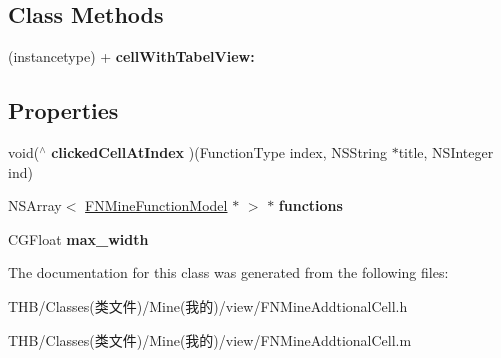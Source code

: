 \subsection*{Class Methods}
\begin{DoxyCompactItemize}
\item 
\mbox{\label{interface_f_n_mine_addtional_cell_ae7cf18af97248812af0f597f8e801eae}} 
(instancetype) + {\bfseries cell\+With\+Tabel\+View\+:}
\end{DoxyCompactItemize}
\subsection*{Properties}
\begin{DoxyCompactItemize}
\item 
\mbox{\label{interface_f_n_mine_addtional_cell_a72e95295e03e4619321e15151ff4f55a}} 
void($^\wedge$ {\bfseries clicked\+Cell\+At\+Index} )(Function\+Type index, N\+S\+String $\ast$title, N\+S\+Integer ind)
\item 
\mbox{\label{interface_f_n_mine_addtional_cell_aedd3a59fe5e9d6292b82e438fa679140}} 
N\+S\+Array$<$ \mbox{\hyperlink{interface_f_n_mine_function_model}{F\+N\+Mine\+Function\+Model}} $\ast$ $>$ $\ast$ {\bfseries functions}
\item 
\mbox{\label{interface_f_n_mine_addtional_cell_a823d92088321e1df8100ec7189401ecd}} 
C\+G\+Float {\bfseries max\+\_\+width}
\end{DoxyCompactItemize}


The documentation for this class was generated from the following files\+:\begin{DoxyCompactItemize}
\item 
T\+H\+B/\+Classes(类文件)/\+Mine(我的)/view/F\+N\+Mine\+Addtional\+Cell.\+h\item 
T\+H\+B/\+Classes(类文件)/\+Mine(我的)/view/F\+N\+Mine\+Addtional\+Cell.\+m\end{DoxyCompactItemize}
